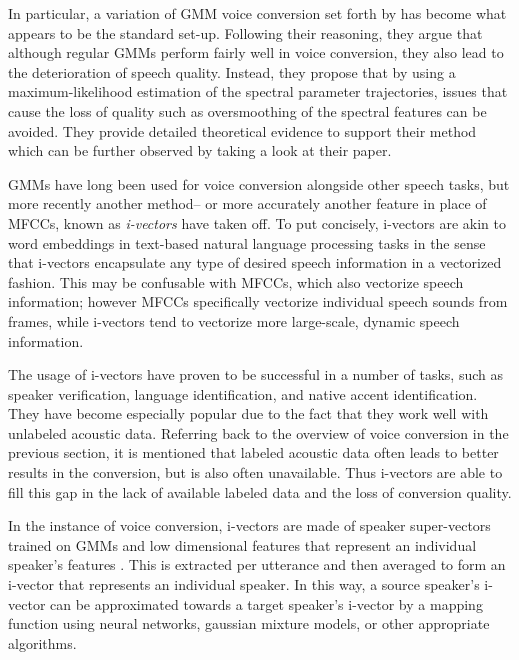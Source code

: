 \documentclass
[
    a4paper,
    twoside,
    12pt,
]
{report}
\begin{document}
In particular, a variation of GMM voice conversion set forth by
\textcite{toda2007} has become what appears to be the standard set-up.
Following their reasoning, they argue that although regular GMMs perform
fairly well in voice conversion, they also lead to the deterioration of
speech quality. Instead, they propose that by using a maximum-likelihood
estimation of the spectral parameter trajectories, issues that cause the
loss of quality such as oversmoothing of the spectral features can be
avoided. They provide detailed theoretical evidence to support their
method which can be further observed by taking a look at their paper.

GMMs have long been used for voice conversion alongside other speech
tasks, but more recently another method-- or more accurately another
feature in place of MFCCs, known as \emph{i-vectors} have taken off. To
put concisely, i-vectors are akin to word embeddings in text-based
natural language processing tasks in the sense that i-vectors
encapsulate any type of desired speech information in a vectorized
fashion. This may be confusable with MFCCs, which also vectorize speech
information; however MFCCs specifically vectorize individual speech
sounds from frames, while i-vectors tend to vectorize more large-scale,
dynamic speech information.

The usage of i-vectors have proven to be successful in a number of
tasks, such as speaker verification, language identification, and native
accent identification. They have become especially popular due to the
fact that they work well with unlabeled acoustic data. Referring back to
the overview of voice conversion in the previous section, it is
mentioned that labeled acoustic data often leads to better results in
the conversion, but is also often unavailable. Thus i-vectors are able
to fill this gap in the lack of available labeled data and the loss of
conversion quality.

In the instance of voice conversion, i-vectors are made of speaker
super-vectors trained on GMMs and low dimensional features that
represent an individual speaker's features \parencite{wu2016}. This is
extracted per utterance and then averaged to form an i-vector that
represents an individual speaker. In this way, a source speaker's
i-vector can be approximated towards a target speaker's i-vector by a
mapping function using neural networks, gaussian mixture models, or
other appropriate algorithms.
\end{document}
